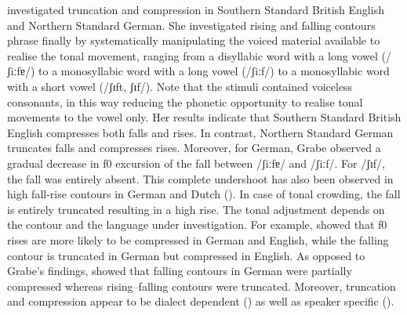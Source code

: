 \citet{Grabe1998} investigated truncation and compression  in Southern Standard British English and Northern Standard German. She investigated rising and falling contours phrase finally by systematically manipulating the voiced material available to realise the tonal movement, ranging from a disyllabic word with a long vowel (/ʃiːfɐ/) to a monosyllabic word with a long vowel (/ʃiːf/) to a monosyllabic word with a short vowel (/ʃɪft, ʃɪf/). Note that the stimuli contained voiceless consonants, in this way reducing the phonetic opportunity to realise tonal movements to the vowel only. Her results indicate that Southern Standard British English compresses both falls and rises. In contrast, Northern Standard German truncates falls and compresses rises. Moreover, for German, Grabe observed a gradual decrease in f0 excursion of the fall between /ʃiːfɐ/ and /ʃiːf/. For /ʃɪf/, the fall was entirely absent. This complete undershoot has also been observed in high fall-rise contours in German and Dutch (\citealt{Lickley.etal2005,Ladd2008}). In case of tonal crowding, the fall is entirely truncated resulting in a high rise. The tonal adjustment depends on the contour and the language under investigation. For example, \citet{Grabe1998} showed that f0 rises are more likely to be compressed in German and English, while the falling contour is truncated in German but compressed in English. As opposed to Grabe’s findings, \citet{Rathcke2009} showed that falling contours in German were partially compressed whereas rising–falling contours were truncated. Moreover, truncation and compression appear to be dialect dependent (\citealt{BannertBredwad1975,Grabe.etal2000}) as well as speaker specific (\citealt{PrietoOrtega2009}).


